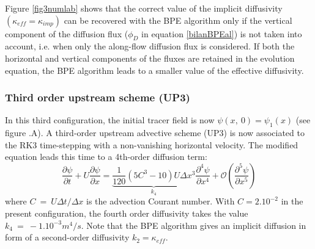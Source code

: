 Figure \ref{fig3numlab} shows that the correct value of the implicit diffusivity $(\kappa_{eff}=\kappa_{imp})$ can be recovered with the BPE algorithm only if the vertical component of the diffusion flux ($\phi_D$ in equation \ref{bilanBPEal}) is not taken into account, i.e. when only the along-flow diffusion flux is considered. If both the horizontal and vertical components of the fluxes are retained in the evolution equation, the BPE algorithm leads to a smaller value of the effective diffusivity.



\subsubsection{Third order upstream scheme (UP3)}
In this third configuration, the initial tracer field is now $\psi(x,\ 0)=\psi_1(x)$ (see figure .A).%
A third-order upstream advective scheme (UP3) is now associated to the RK3 time-stepping with a non-vanishing horizontal velocity. The modified equation leads this time to a 4th-order diffusion term:
\begin{equation}
\frac{\partial \psi}{\partial t}+U \frac{\partial \psi}{\partial x} = \underbrace{\frac{1}{120}(5 C^3-10) U \Delta x^3}_{k_4}  \frac{\partial^4 \psi}{\partial x^4} + \mathcal{O}(\frac{\partial^5 \psi}{\partial x^5})
\end{equation}
where $C\ =\ U\Delta t/\Delta x$ is the advection Courant number. With $C=2 . 10^{-2}$ in the present configuration, the fourth order diffusivity takes the value $k_4\ =\ -1.10^{-3} m^4/s$. Note that the BPE algorithm gives an implicit diffusion in form of a second-order diffusivity $k_2=\kappa_{eff}$.


